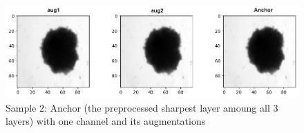 \begin{figure}[H]
  \centering
  \includegraphics[width=0.9\linewidth]{figures/1_2.png} %
  \caption{Sample 2: Anchor (the preprocessed sharpest layer amoung all 3 layers) with one channel and its augmentations}
  \label{fig:1doutput3}
\end{figure}




